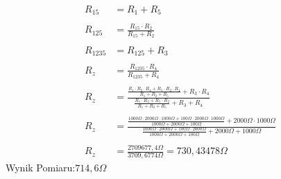 \documentclass[polish,polish,a4paper]{article}
\begin{document}
\begin{equation}
\begin{aligned}
R_{15} &= R_1 + R_5
\\
\\
R_{125} &= \frac{R_{15}  \cdot  R_2}{R_{15} + R_2}
\\
\\
R_{1235} &= R_{125}+R_3
\\
\\
R_z &= \frac{R_{1235} \cdot R_4}{R_{1235}+R_4}
\\
\\
R_z &= \frac{ \frac{R_1  \cdot  R_2  \cdot  R_4 +R_5  \cdot  R_2  \cdot  R_4 }{R_1 + R_2 + R_5} + R_3 \cdot R_4}{\frac{R_1  \cdot  R_2 +R_5  \cdot  R_2 }{R_1 + R_2 + R_5} + R_3 + R_4}
\\
\\
R_z &= \frac{ \frac{ 1000\Omega  \cdot  2000\Omega  \cdot  1000\Omega + 100\Omega  \cdot  2000\Omega  \cdot  1000\Omega }{1000\Omega + 2000\Omega + 100\Omega} +2000\Omega \cdot 1000\Omega }{\frac{ 1000\Omega  \cdot  2000\Omega + 100\Omega  \cdot  2000\Omega }{1000\Omega + 2000\Omega + 100\Omega} +2000\Omega + 1000\Omega}
\\
\\
R_z &= \frac{ 2709677,4\Omega}{3709,6774 \Omega} =  730,43478  \Omega
  \end{aligned} 
\end{equation}
Wynik Pomiaru:$714,6\Omega$
\end{document}
